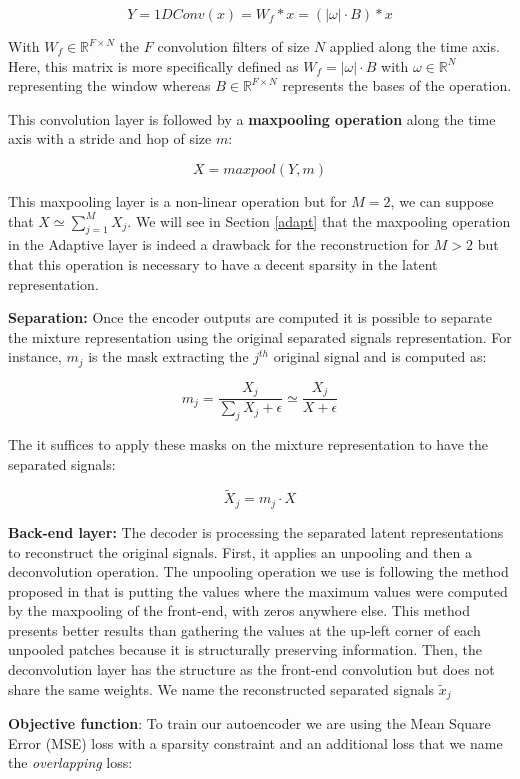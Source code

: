 \documentclass[master, tikz, final,11pt, dvipdfmx]{iscs-thesis}
\begin{document}
\[Y = 1DConv(x) = W_{f} \ast x = (|\omega| \cdot B) \ast x\]

With $W_f \in \mathbb{R}^{F\times N}$ the $F$ convolution filters of size $N$ applied along the time axis. Here, this matrix is more specifically defined as $W_f = |\omega|\cdot B$ with $\omega \in \mathbb{R}^{N}$ representing the window whereas $B \in \mathbb{R}^{F\times N}$ represents the bases of the operation.

This convolution layer is followed by a \textbf{maxpooling operation} along the time axis with a stride and hop of size $m$:

\[X = maxpool(Y, m)\]

This maxpooling layer is a non-linear operation but for $M = 2$, we can suppose that $X \simeq \sum_{j=1}^{M}{X_j}$. We will see in Section \ref{adapt} that the maxpooling operation in the Adaptive layer is indeed a drawback for the reconstruction for $M > 2$ but that this operation is necessary to have a decent sparsity in the latent representation.

\textbf{Separation:} Once the encoder outputs are computed it is possible to separate the mixture representation using the original separated signals representation. For instance, $m_j$ is the mask extracting the $j^{th}$ original signal and is computed as:

\[m_j = \frac{X_j}{\sum_j{X_j} + \epsilon} \simeq  \frac{X_j}{X + \epsilon}\]

The it suffices to apply these masks on the mixture representation to have the separated signals:

\[\tilde X _j = m_j \cdot X\]

\textbf{Back-end layer:} The decoder is processing the separated latent representations to reconstruct the original signals. First, it applies an unpooling and then a deconvolution operation. The unpooling operation we use is following the method proposed in \cite{unpool} that is putting the values where the maximum values were computed by the maxpooling of the front-end, with zeros anywhere else. This method presents better results than gathering the values at the up-left corner of each unpooled patches because it is structurally preserving information. Then, the deconvolution layer has the structure as the front-end convolution but does not share the same weights. We name the reconstructed separated signals $\tilde x _j$

\textbf{Objective function}: To train our autoencoder we are using the Mean Square Error (MSE) loss with a sparsity constraint and an additional loss that we name the \textit{overlapping} loss:
\end{document}

